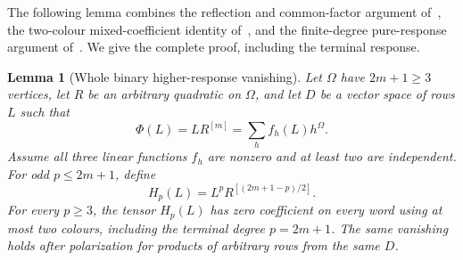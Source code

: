 \documentclass[11pt]{article}
\newtheorem{lemma}[theorem]{Lemma}
\theoremstyle{definition}
\theoremstyle{plain}
\numberwithin{equation}{section}
\begin{document}
The following lemma combines the reflection and common-factor argument
of~\cite{factors}, the two-colour mixed-coefficient identity of~\cite{mixed},
and the finite-degree pure-response argument of~\cite{pure}. We give the
complete proof, including the terminal response.

\begin{lemma}[Whole binary higher-response vanishing]\label{lem:higher}
Let \(\Omega\) have \(2m+1\ge3\) vertices, let \(R\) be an arbitrary quadratic
on \(\Omega\), and let \(D\) be a vector space of rows \(L\) such that
\begin{equation}
 \Phi(L)=L R^{[m]}=\sum_h f_h(L)h^\Omega.
 \tag{2}\label{eq:root}
\end{equation}
Assume all three linear functions \(f_h\) are nonzero and at least two are
independent. For odd \(p\le2m+1\), define
\[
 H_p(L)=L^p R^{[(2m+1-p)/2]}.
\]
For every \(p\ge3\), the tensor \(H_p(L)\) has zero coefficient on every word
using at most two colours, including the terminal degree \(p=2m+1\).
The same vanishing holds after polarization for products of arbitrary rows
from the same \(D\).
\end{lemma}
\end{document}
